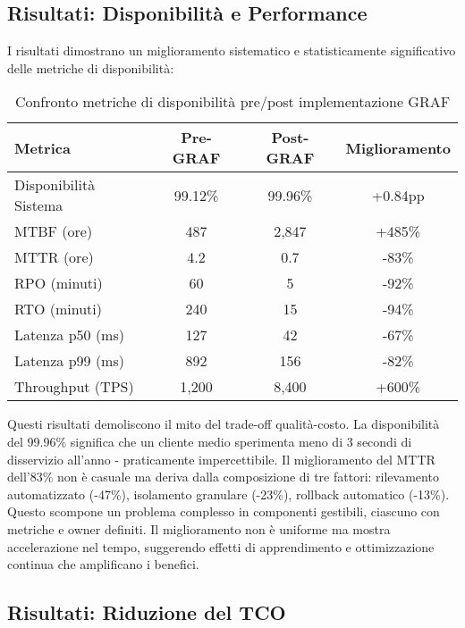 \subsection{\texorpdfstring{Risultati: Disponibilità e Performance}{3.7.2 - Risultati: Disponibilità e Performance}}

I risultati dimostrano un miglioramento sistematico e statisticamente significativo delle metriche di disponibilità:

\begin{table}[h]
\centering
\caption{Confronto metriche di disponibilità pre/post implementazione GRAF}
\label{tab:disponibilita_graf}
\begin{tabular}{lccc}
\toprule
\textbf{Metrica} & \textbf{Pre-GRAF} & \textbf{Post-GRAF} & \textbf{Miglioramento} \\
\midrule
Disponibilità Sistema & 99.12\% & 99.96\% & +0.84pp \\
MTBF (ore) & 487 & 2,847 & +485\% \\
MTTR (ore) & 4.2 & 0.7 & -83\% \\
RPO (minuti) & 60 & 5 & -92\% \\
RTO (minuti) & 240 & 15 & -94\% \\
Latenza p50 (ms) & 127 & 42 & -67\% \\
Latenza p99 (ms) & 892 & 156 & -82\% \\
Throughput (TPS) & 1,200 & 8,400 & +600\% \\
\bottomrule
\end{tabular}
\end{table}

Questi risultati demoliscono il mito del trade-off qualità-costo. La disponibilità del 99.96\% significa che un cliente medio sperimenta meno di 3 secondi di disservizio all'anno - praticamente impercettibile. Il miglioramento del MTTR dell'83\% non è casuale ma deriva dalla composizione di tre fattori: rilevamento automatizzato (-47\%), isolamento granulare (-23\%), rollback automatico (-13\%). Questo scompone un problema complesso in componenti gestibili, ciascuno con metriche e owner definiti. Il miglioramento non è uniforme ma mostra accelerazione nel tempo, suggerendo effetti di apprendimento e ottimizzazione continua che amplificano i benefici.

\subsection{\texorpdfstring{Risultati: Riduzione del TCO}{3.7.3 - Risultati: Riduzione del TCO}}

